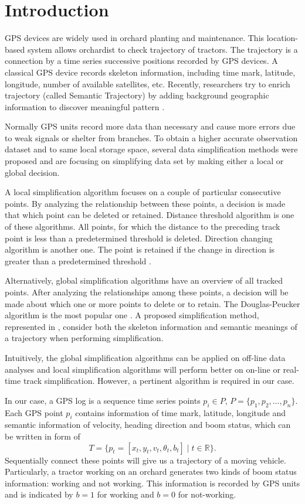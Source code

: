 
\section{Introduction}

GPS devices are widely used in orchard planting and maintenance. This location-based system allows orchardist to check trajectory of tractors. The trajectory is a connection by a time series successive positions recorded by GPS devices. A classical GPS device records skeleton information, including time mark, latitude, longitude, number of available satellites, etc. Recently, researchers try to enrich trajectory (called Semantic Trajectory) by adding background geographic information to discover meaningful pattern \cite{ying2011semantic}. 


Normally GPS units record more data than necessary and cause more errors due to weak signals or shelter from branches. To obtain a higher accurate observation dataset and to same local storage space, several data simplification methods were proposed and are focusing on simplifying data set by making either a local or global decision. 

A local simplification algorithm focuses on a couple of particular consecutive points. By analyzing the relationship between these points, a decision is made that which point can be deleted or retained. Distance threshold algorithm is one of these algorithms. All points, for which the distance to the preceding track point is less than a predetermined threshold is deleted. Direction changing algorithm is another one. The point is retained if the change in direction is greater than a predetermined threshold  \cite{ivanov2012real}. 

Alternatively, global simplification algorithms have an overview of all tracked points. After analyzing the relationships among these points, a decision will be made about which one or more points to delete or to retain. The Douglas-Peucker algorithm is the most popular one  \cite{douglas1973algorithms}. A proposed simplification method, represented in \cite{chen2009trajectory}, consider both the skeleton information and semantic meanings of a trajectory when performing simplification. 


Intuitively, the global simplification algorithms can be applied on off-line data analyses and local simplification algorithms will perform better on on-line or real-time track simplification. However, a pertinent algorithm is required in our case. 


In our case, a GPS log is a sequence time series points $p_i \in P$, $P=\{ p_1,p_2, \ldots, p_n \}$. Each GPS point $p_i$ contains information of time mark, latitude, longitude and semantic information of velocity, heading direction and boom status, which can be written in form of
\begin{equation}
T=\{p_t=[x_t,y_t,v_t,\theta_t,b_t] \mid t \in \mathbb{R} \}.
\end{equation}
Sequentially connect these points will give us a trajectory of a moving vehicle.
Particularly, a tractor working on an orchard generates two kinds of boom status information: working and not working. This information is recorded by GPS units and is indicated by $b=1$ for working and $b=0$ for not-working.


